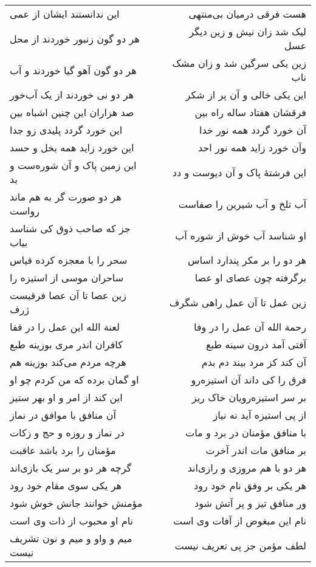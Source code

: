 \begin{center}
\begin{longtable}{l p{0.5cm} r}
این ندانستند ایشان از عمی
&&
هست فرقی درمیان بی‌منتهی
\\
هر دو گون زنبور خوردند از محل
&&
لیک شد زان نیش و زین دیگر عسل
\\
هر دو گون آهو گیا خوردند و آب
&&
زین یکی سرگین شد و زان مشک ناب
\\
هر دو نی خوردند از یک آب‌خور
&&
این یکی خالی و آن پر از شکر
\\
صد هزاران این چنین اشباه بین
&&
فرقشان هفتاد ساله راه بین
\\
این خورد گردد پلیدی زو جدا
&&
آن خورد گردد همه نور خدا
\\
این خورد زاید همه بخل و حسد
&&
وآن خورد زاید همه نور احد
\\
این زمین پاک و آن شوره‌ست و بد
&&
این فرشتهٔ پاک و آن دیوست و دد
\\
هر دو صورت گر به هم ماند رواست
&&
آب تلخ و آب شیرین را صفاست
\\
جز که صاحب ذوق کی شناسد بیاب
&&
او شناسد آب خوش از شوره آب
\\
سحر را با معجزه کرده قیاس
&&
هر دو را بر مکر پندارد اساس
\\
ساحران موسی از استیزه را
&&
برگرفته چون عصای او عصا
\\
زین عصا تا آن عصا فرقیست ژرف
&&
زین عمل تا آن عمل راهی شگرف
\\
لعنة الله این عمل را در قفا
&&
رحمة الله آن عمل را در وفا
\\
کافران اندر مری بوزینه طبع
&&
آفتی آمد درون سینه طبع
\\
هرچه مردم می‌کند بوزینه هم
&&
آن کند کز مرد بیند دم بدم
\\
او گمان برده که من کردم چو او
&&
فرق را کی داند آن استیزه‌رو
\\
این کند از امر و او بهر ستیز
&&
بر سر استیزه‌رویان خاک ریز
\\
آن منافق با موافق در نماز
&&
از پی استیزه آید نه نیاز
\\
در نماز و روزه و حج و زکات
&&
با منافق مؤمنان در برد و مات
\\
مؤمنان را برد باشد عاقبت
&&
بر منافق مات اندر آخرت
\\
گرچه هر دو بر سر یک بازی‌اند
&&
هر دو با هم مروزی و رازی‌اند
\\
هر یکی سوی مقام خود رود
&&
هر یکی بر وفق نام خود رود
\\
مؤمنش خوانند جانش خوش شود
&&
ور منافق تیز و پر آتش شود
\\
نام او محبوب از ذات وی است
&&
نام این مبغوض از آفات وی است
\\
میم و واو و میم و نون تشریف نیست
&&
لطف مؤمن جز پی تعریف نیست
\\

\end{longtable}
\end{center}
